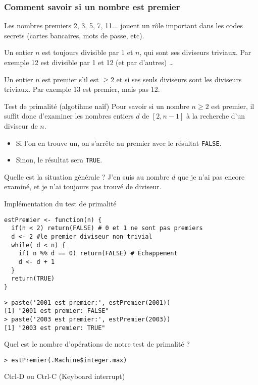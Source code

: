 \documentclass[10pt]{beamer}
\begin{document}
\begin{frame}
  \frametitle{Comment savoir si un nombre est premier}
Les nombres premiers 2, 3, 5, 7, 11... jouent un rôle important dans les codes secrets (cartes bancaires, mots de passe, etc).

Un entier $n$ est toujours divisible par $1$ et $n$, qui sont ses diviseurs triviaux.
Par exemple 12 est divisible par 1 et 12 (et par d'autres) \dots

Un entier $n$ est premier s'il est $\geq 2$ et si ses seuls diviseurs sont les diviseurs triviaux.
Par exemple 13 est premier, mais pas 12.

\begin{block}{Test de primalité (algotihme naïf)}
  Pour savoir si un nombre $n \geq 2$ est premier, il suffit donc d'examiner les nombres entiers $d$ de $[2,n-1]$ à la recherche d'un diviseur de $n$.
  \begin{itemize}
  \item Si l'on en trouve un, on s'arrête au premier avec le résultat \texttt{FALSE}.
  \item Sinon, le résultat sera \texttt{TRUE}.  

  \end{itemize}
\end{block}

\begin{block}{Quelle est la situation générale ?}
 J'en suis au nombre $d$ que je n'ai pas encore examiné, et je n'ai toujours pas trouvé de diviseur.  
\end{block}
\end{frame}
\begin{frame}[fragile]{Implémentation du test de primalité}
  \begin{lstlisting}[style=editor]
estPremier <- function(n) {
  if(n < 2) return(FALSE) # 0 et 1 ne sont pas premiers
  d <- 2 #le premier diviseur non trivial
  while( d < n) {
    if( n %% d == 0) return(FALSE) # Échappement
    d <- d + 1
  }
  return(TRUE)
}    
\end{lstlisting}

\begin{lstlisting}
> paste('2001 est premier:', estPremier(2001))
[1] "2001 est premier: FALSE"  
> paste('2003 est premier:', estPremier(2003))
[1] "2003 est premier: TRUE"
\end{lstlisting}

\begin{alertblock}{Quel est le nombre d'opérations de notre test de primalité ?}
  \begin{lstlisting}[style=edblock]
> estPremier(.Machine$integer.max)   
\end{lstlisting}
Ctrl-D ou Ctrl-C (Keyboard interrupt)
\end{alertblock}
\end{frame}
\end{document}
